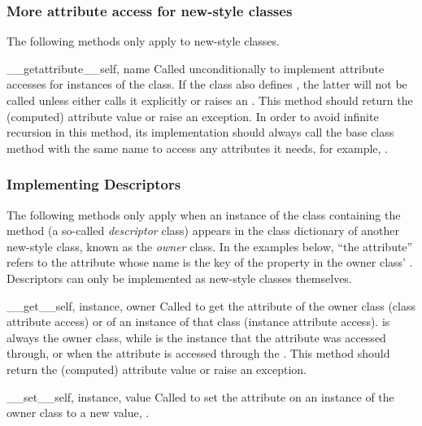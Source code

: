 \subsubsection{More attribute access for new-style classes \label{new-style-attribute-access}}

The following methods only apply to new-style classes.

\begin{methoddesc}[object]{__getattribute__}{self, name}
Called unconditionally to implement attribute accesses for instances
of the class. If the class also defines , the latter 
will not be called unless  either calls it 
explicitly or raises an .
This method should return the (computed) attribute
value or raise an  exception.
In order to avoid infinite recursion in this method, its
implementation should always call the base class method with the same
name to access any attributes it needs, for example,
.
\end{methoddesc}

\subsubsection{Implementing Descriptors \label{descriptors}}

The following methods only apply when an instance of the class
containing the method (a so-called \emph{descriptor} class) appears in
the class dictionary of another new-style class, known as the
\emph{owner} class. In the examples below, ``the attribute'' refers to
the attribute whose name is the key of the property in the owner
class' .  Descriptors can only be implemented as
new-style classes themselves.

\begin{methoddesc}[object]{__get__}{self, instance, owner}
Called to get the attribute of the owner class (class attribute access)
or of an instance of that class (instance attribute access).
 is always the owner class, while  is the
instance that the attribute was accessed through, or  when
the attribute is accessed through the .  This method should
return the (computed) attribute value or raise an
 exception.
\end{methoddesc}

\begin{methoddesc}[object]{__set__}{self, instance, value}
Called to set the attribute on an instance  of the owner
class to a new value, .
\end{methoddesc}

